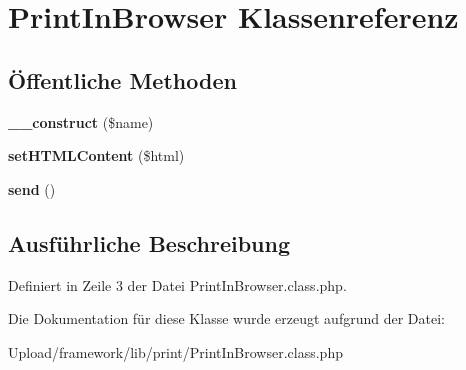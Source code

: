 \hypertarget{class_print_in_browser}{}\section{Print\+In\+Browser Klassenreferenz}
\label{class_print_in_browser}
\subsection*{Öffentliche Methoden}
\begin{DoxyCompactItemize}
\item 
\mbox{\label{class_print_in_browser_a13cf5711d257e2801172a73c4ddb9dee}} 
{\bfseries \+\_\+\+\_\+construct} (\$name)
\item 
\mbox{\label{class_print_in_browser_ab640f4337d3f40a03092537d2779935f}} 
{\bfseries set\+H\+T\+M\+L\+Content} (\$html)
\item 
\mbox{\label{class_print_in_browser_a54c5b40749ad6e534d3b0db8ec0db21b}} 
{\bfseries send} ()
\end{DoxyCompactItemize}


\subsection{Ausführliche Beschreibung}


Definiert in Zeile 3 der Datei Print\+In\+Browser.\+class.\+php.



Die Dokumentation für diese Klasse wurde erzeugt aufgrund der Datei\+:\begin{DoxyCompactItemize}
\item 
Upload/framework/lib/print/Print\+In\+Browser.\+class.\+php\end{DoxyCompactItemize}

